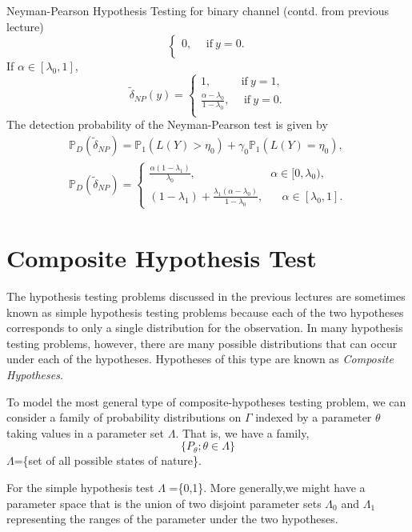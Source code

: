 \documentclass[a4paper,english,12pt]{article}
\begin{document}
\begin{exmp}{Neyman-Pearson Hypothesis Testing for binary channel (contd. from previous lecture)}
\begin{equation}
\begin{cases}
0,\hspace{15pt}\mbox{if}~y=0.\\
\end{cases}
\end{equation}
If $\alpha \in [\lambda_0,1]$,
\begin{equation}
\tilde{\delta}_{NP} (y) =\begin{cases}
1,\hspace{32pt}\mbox{if}~y=1,\\
\frac{\alpha - \lambda_0}{1-\lambda_0},\hspace{15pt}\mbox{if}~y=0.\\
\end{cases}
\end{equation}
The detection probability of the Neyman-Pearson test is given by 
\begin{eqnarray}
\mathbb{P}_D (\tilde{\delta}_{NP}) =\mathbb{P}_1(L(Y) > \eta_0) + \gamma_0 \mathbb{P}_1(L(Y) = \eta_0),\\\nonumber
\mathbb{P}_D (\tilde{\delta}_{NP}) =\begin{cases}
\frac{\alpha (1-\lambda_1)}{\lambda_0},\hspace{80pt}\alpha \in [0,\lambda_0),\\
(1-\lambda_1) + \frac{\lambda_1 (\alpha -\lambda_0)}{1-\lambda_0},\hspace{20pt}\alpha \in [\lambda_0,1].
\end{cases}
\end{eqnarray}
\end{exmp}
\section{Composite Hypothesis Test}
The hypothesis testing problems discussed in the previous lectures are sometimes known as simple hypothesis testing problems because each of the two hypotheses corresponds to only a single distribution for the observation. In many hypothesis testing problems, however, there are many possible distributions that can occur under each of the hypotheses. Hypotheses of this type are known as \textit{Composite Hypotheses}.
\par To model the most general type of composite-hypotheses testing problem, we can consider a family of probability distributions on $\Gamma$ indexed by a parameter $\theta$ taking values in a parameter set $\Lambda$. That is, we have a family,
\begin{equation}
\{P_\theta;\theta \in \Lambda\}
\end{equation}
$\Lambda$=\{set of all possible states of nature\}.
\begin{exmp}
For the simple hypothesis test $\Lambda$ =\{0,1\}. More generally,we might have a parameter space that is the union of two disjoint parameter sets $\Lambda_0$ and $\Lambda_1$ representing the ranges of the parameter under the two hypotheses. 
\end{exmp}
\end{document}
